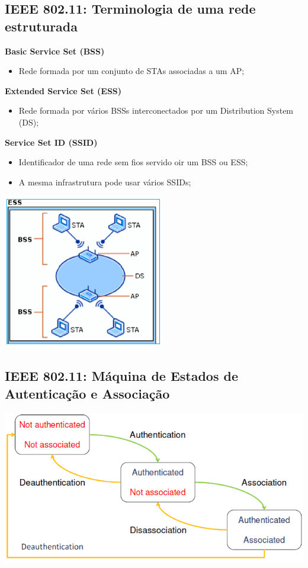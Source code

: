 \documentclass{article}
\begin{document}
\subsection{IEEE 802.11: Terminologia de uma rede estruturada}

\begin{flushleft}
  \textbf{Basic Service Set (BSS)}
  \begin{itemize}
    \item Rede formada por um conjunto de STAs associadas a um AP;
  \end{itemize}

  \textbf{Extended Service Set (ESS)}
  \begin{itemize}
    \item Rede formada por vários BSSs interconectados por um
    Distribution System (DS);
  \end{itemize}

  \textbf{Service Set ID (SSID)}
  \begin{itemize}
    \item Identificador de uma rede sem fios servido oir um BSS ou ESS;
    \item A mesma infrastrutura pode usar vários SSIDs;
  \end{itemize}
\end{flushleft}

\begin{center}
  \includegraphics[scale=0.6]{41}
\end{center}

\pagebreak

\subsection{IEEE 802.11: Máquina de Estados de Autenticação e Associação}

\begin{center}
  \includegraphics[scale=0.6]{42}
\end{center}
\end{document}
